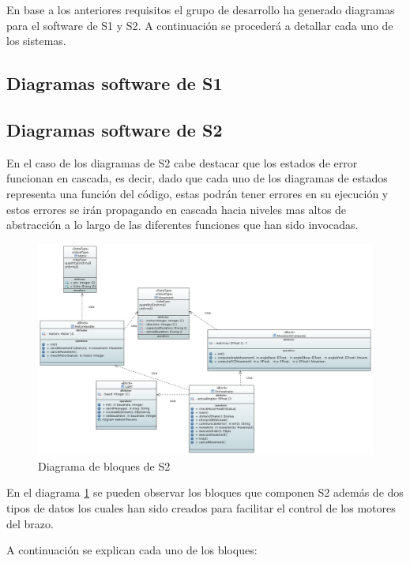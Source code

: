 En base a los anteriores requisitos el grupo de desarrollo ha generado diagramas para el software de \ac{S1} y \ac{S2}. A continuación se procederá a detallar cada uno de los sistemas.


\subsection{Diagramas software de S1}



\subsection{Diagramas software de S2}

En el caso de los diagramas de \ac{S2} cabe destacar que los estados de error funcionan en cascada, es decir, dado que cada uno de los diagramas de estados representa una función del código, estas podrán tener errores en su ejecución y estos errores se irán propagando en cascada hacia niveles mas altos de abstracción a lo largo de las diferentes funciones que han sido invocadas.

\begin{figure}[H]
    \centering
    \includegraphics[width=\linewidth]{pictures/S2BlockDiagram.PNG}
    \caption{Diagrama de bloques de \ac{S2}}
    \label{fig:diagrama_bloques_s2}
\end{figure}

En el diagrama \ref{fig:diagrama_bloques_s2} se pueden observar los bloques que componen \ac{S2} además de dos tipos de datos los cuales han sido creados para facilitar el control de los motores del brazo.

A continuación se explican cada uno de los bloques:

